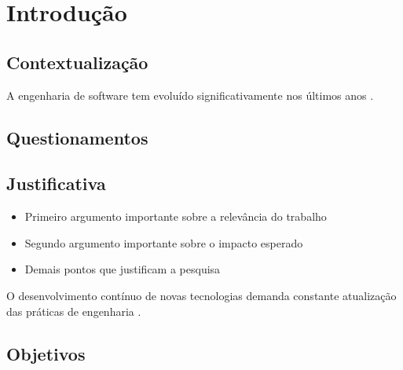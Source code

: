 \chapter{Introdução}
\label{1-introducao}


\section{Contextualização}
\label{1-contextualizacao}

\begin{citacao}
A engenharia de software tem evoluído significativamente nos últimos anos \cite{inmetro2003}.
\end{citacao}

\section{Questionamentos}
\label{1-questao}

\section{Justificativa}
\label{1-justificativa}

\begin{itemize}
\item Primeiro argumento importante sobre a relevância do trabalho
\item Segundo argumento importante sobre o impacto esperado
\item Demais pontos que justificam a pesquisa
\end{itemize}

\begin{citacao}
O desenvolvimento contínuo de novas tecnologias demanda constante atualização das práticas de engenharia \cite{Sommerville2007}.
\end{citacao}

\section{Objetivos}
\label{1-objetivos}

